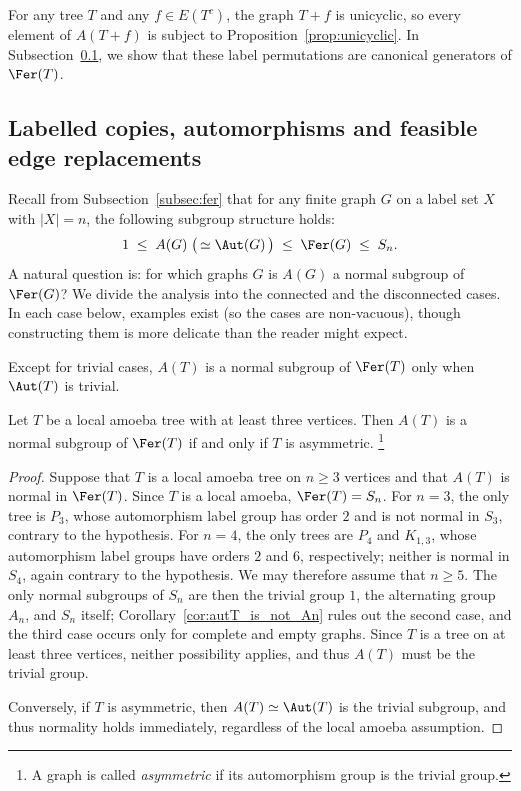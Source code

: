 For any tree $T$ and any $f\in E(T^c)$, the graph $T+f$ is unicyclic, so every element of $A(T+f)$ is subject to Proposition~\ref{prop:unicyclic}.
In Subsection~\ref{subsec:labelled-copies}, we show that these label permutations are canonical generators of $\Fer(T)$.

\subsection{Labelled copies, automorphisms and feasible edge replacements}\label{subsec:labelled-copies}

Recall from Subsection~\ref{subsec:fer} that for any finite graph $G$ on a label set $X$ with $|X|=n$, the following subgroup structure holds:
$$
    1\;\leq\; A(G)\;\bigl(\,\simeq\Aut(G)\,\bigr)\;\leq\;\Fer(G)\;\leq\; S_n.
$$
A natural question is: for which graphs $G$ is $A(G)$ a normal subgroup of $\Fer(G)$?
We divide the analysis into the connected and the disconnected cases.
In each case below, examples exist (so the cases are non-vacuous), though constructing them is more delicate than the reader might expect.

Except for trivial cases, $A(T)$ is a normal subgroup of $\Fer(T)$ only when $\Aut(T)$ is trivial.

\begin{proposition}\label{prop:local-amoeba-tree-asymmetric}
    Let $T$ be a local amoeba tree with at least three vertices.
    Then $A(T)$ is a normal subgroup of $\Fer(T)$ if and only if $T$ is asymmetric.%
    \footnote{A graph is called \emph{asymmetric} if its automorphism group is the trivial group.}
\end{proposition}

\begin{proof}
    Suppose that $T$ is a local amoeba tree on $n\geq3$ vertices and that $A(T)$ is normal in $\Fer(T)$.
    Since $T$ is a local amoeba, $\Fer(T)=S_n$.
    For $n=3$, the only tree is $P_3$, whose automorphism label group has order $2$ and is not normal in $S_3$, contrary to the hypothesis.
    For $n=4$, the only trees are $P_4$ and $K_{1,3}$, whose automorphism label groups have orders $2$ and $6$, respectively; neither is normal in $S_4$, again contrary to the hypothesis.
    We may therefore assume that $n\geq5$.
    The only normal subgroups of $S_n$ are then the trivial group $1$, the alternating group $A_n$, and $S_n$ itself; Corollary~\ref{cor:autT_is_not_An} rules out the second case, and the third case occurs only for complete and empty graphs.
    Since $T$ is a tree on at least three vertices, neither possibility applies, and thus $A(T)$ must be the trivial group.

    Conversely, if $T$ is asymmetric, then $A(T)\simeq\Aut(T)$ is the trivial subgroup, and thus normality holds immediately, regardless of the local amoeba assumption.
\end{proof}

